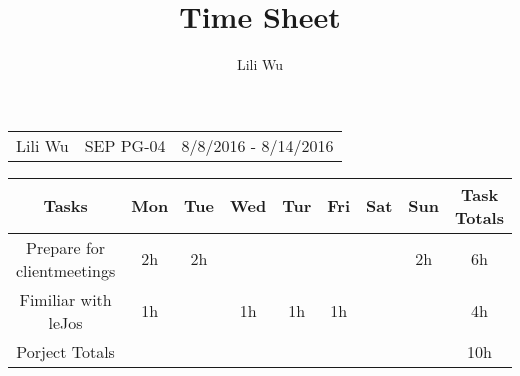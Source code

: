 \documentclass[a4paper]{article}
\title{Time Sheet}
\author{Lili Wu}
\begin{document}
\maketitle

\begin{table}[h] 
\begin{tabular}{l c r}
Lili Wu & SEP PG-04 & 8/8/2016 - 8/14/2016    \\
\end{tabular}
\end{table}

\begin{table}[h]
\centering
\begin{tabular}{ccccccccc}\renewcommand{\arraystretch}{4}
Tasks & Mon & Tue & Wed & Tur & Fri & Sat & Sun & Task Totals \\\hline
Prepare for clientmeetings & 2h & 2h & & & & & 2h & 6h \\
Fimiliar with leJos & 1h & & 1h & 1h & 1h & & & 4h\\\hline
Porject Totals & & & & & & & & 10h\\\hline

\end{tabular}
\end{table}
\end{document}
